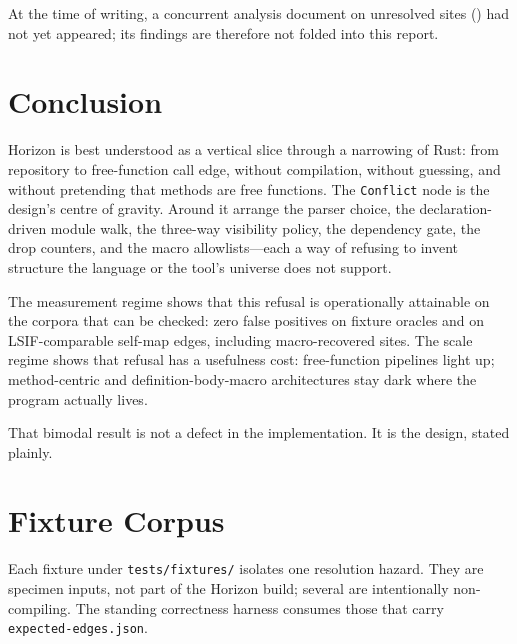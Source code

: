 \documentclass[11pt,a4paper,oneside]{report}
\newcommand{\horizon}{Horizon}
\begin{document}
At the time of writing, a concurrent analysis document on unresolved sites
() had not yet appeared; its findings are
therefore not folded into this report.

\chapter{Conclusion}
\label{ch:conclusion}

\horizon{} is best understood as a vertical slice through a narrowing of Rust:
from repository to free-function call edge, without compilation, without
guessing, and without pretending that methods are free functions. The
\texttt{Conflict} node is the design's centre of gravity. Around it arrange
the parser choice, the declaration-driven module walk, the three-way
visibility policy, the dependency gate, the drop counters, and the macro
allowlists---each a way of refusing to invent structure the language or the
tool's universe does not support.

The measurement regime shows that this refusal is operationally attainable on
the corpora that can be checked: zero false positives on fixture oracles and
on LSIF-comparable self-map edges, including macro-recovered sites. The scale
regime shows that refusal has a usefulness cost: free-function pipelines light
up; method-centric and definition-body-macro architectures stay dark where the
program actually lives.

That bimodal result is not a defect in the implementation. It is the design,
stated plainly.

\appendix
\chapter{Fixture Corpus}
\label{app:fixtures}

Each fixture under \texttt{tests/fixtures/} isolates one resolution hazard.
They are specimen inputs, not part of the \horizon{} build; several are
intentionally non-compiling. The standing correctness harness consumes those
that carry \texttt{expected-edges.json}.
\end{document}
